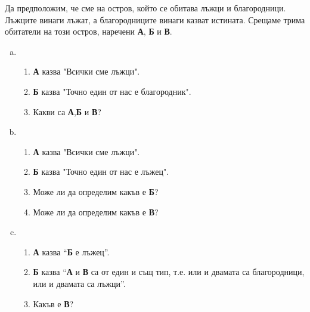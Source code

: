 \begin{problem}
  Да предположим, че сме на остров, който се обитава лъжци и благородници.
  Лъжците винаги лъжат, а благородниците винаги казват истината.
  Срещаме трима обитатели на този остров, наречени {\bf А}, {\bf Б} и {\bf В}.
  \begin{enumerate}[a)]
  \item
    \begin{enumerate}[]
    \item
      {\bf А} казва "Всички сме лъжци".
    \item
      {\bf Б} казва "Точно един от нас е благородник".
    \item
      Какви са {\bf А},{\bf Б} и {\bf В}?
    \end{enumerate}
  \item
    \begin{enumerate}[]
    \item
      {\bf А} казва "Всички сме лъжци".
    \item
      {\bf Б} казва "Точно един от нас е лъжец".
    \item
      Може ли да определим какъв е {\bf Б}?
    \item
      Може ли да определим какъв е {\bf В}?
    \end{enumerate}
  \item
    \begin{enumerate}[]
    \item
      {\bf А} казва ``{\bf Б} е лъжец''.
    \item
      {\bf Б} казва ``{\bf А} и {\bf В} са от един и същ тип, т.е. или и двамата са благородници, или и двамата са лъжци''.
    \item
      Какъв е {\bf В}?
    \end{enumerate}
  \end{enumerate}
\end{problem}
